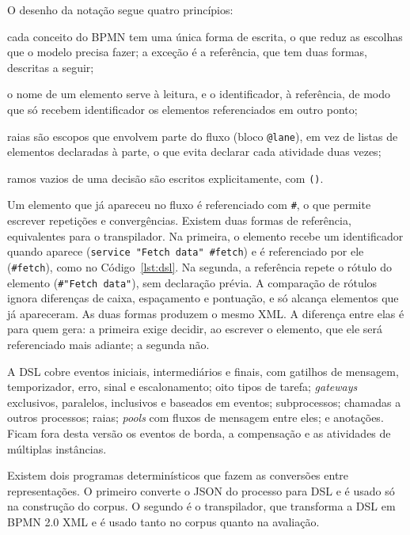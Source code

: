 O desenho da notação segue quatro princípios:

\begin{alineascomnumero}
	\item cada conceito do BPMN tem uma única forma de escrita, o que reduz as escolhas que o modelo precisa fazer; a exceção é a referência, que tem duas formas, descritas a seguir;
	\item o nome de um elemento serve à leitura, e o identificador, à referência, de modo que só recebem identificador os elementos referenciados em outro ponto;
	\item raias são escopos que envolvem parte do fluxo (bloco \texttt{@lane}), em vez de listas de elementos declaradas à parte, o que evita declarar cada atividade duas vezes;
	\item ramos vazios de uma decisão são escritos explicitamente, com \texttt{()}.
\end{alineascomnumero}

Um elemento que já apareceu no fluxo é referenciado com \texttt{\#}, o que permite escrever repetições e convergências. Existem duas formas de referência, equivalentes para o transpilador. Na primeira, o elemento recebe um identificador quando aparece (\verb|service "Fetch data"|\allowbreak\ \verb|#fetch|) e é referenciado por ele (\verb|#fetch|), como no Código~\ref{lst:dsl}. Na segunda, a referência repete o rótulo do elemento (\verb|#"Fetch data"|), sem declaração prévia. A comparação de rótulos ignora diferenças de caixa, espaçamento e pontuação, e só alcança elementos que já apareceram. As duas formas produzem o mesmo XML. A diferença entre elas é para quem gera: a primeira exige decidir, ao escrever o elemento, que ele será referenciado mais adiante; a segunda não.

A DSL cobre eventos iniciais, intermediários e finais, com gatilhos de mensagem, temporizador, erro, sinal e escalonamento; oito tipos de tarefa; \textit{gateways} exclusivos, paralelos, inclusivos e baseados em eventos; subprocessos; chamadas a outros processos; raias; \textit{pools} com fluxos de mensagem entre eles; e anotações. Ficam fora desta versão os eventos de borda, a compensação e as atividades de múltiplas instâncias.

Existem dois programas determinísticos que fazem as conversões entre representações. O primeiro converte o JSON do processo para DSL e é usado só na construção do corpus. O segundo é o transpilador, que transforma a DSL em BPMN 2.0 XML e é usado tanto no corpus quanto na avaliação.


